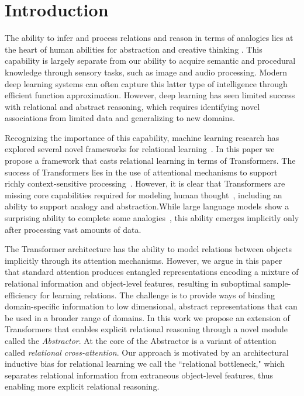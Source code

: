 \section{Introduction}

The ability to infer and process relations and reason in terms of analogies lies at the heart of human abilities for abstraction and creative thinking
\citep{snow,holyoak}. This capability is largely separate from our ability to acquire semantic and procedural knowledge through sensory tasks, such as image and audio processing. Modern deep learning systems can often capture this latter type of intelligence through efficient function approximation. However, deep learning has seen limited success with relational and abstract reasoning, which requires identifying novel associations from limited data and generalizing to new domains.

Recognizing the importance of this capability, machine learning research has explored several novel frameworks for relational learning~\citep{TEM, NTM,episodicControl,shanahanExplicitlyRelationalNeural,esbn,mondal23learned,battaglia,barrett:2018,santoro1}. In this paper we propose a framework that casts relational learning in terms of Transformers. The success of Transformers lies in the use of attentional mechanisms to support richly context-sensitive processing~\citep{transformers,vaswani2017attention,kerg2020untangling}. However, it is clear that Transformers are missing core capabilities required for modeling human thought~\citep{mahowald2023dissociating}, including an ability to support analogy and abstraction.While large language models show a surprising ability to complete some analogies~\citep{webb}, this ability emerges implicitly only after processing vast amounts of data.

The Transformer architecture has the ability to model relations between objects implicitly through its attention mechanisms. However, we argue in this paper that standard attention produces entangled representations encoding a mixture of relational information and object-level features, resulting in suboptimal sample-efficiency for learning relations. The challenge is to provide ways of binding domain-specific information to low dimensional, abstract representations that can be used in a broader range of domains. In this work we propose an extension of Transformers that enables explicit relational reasoning through a novel module called the \textit{Abstractor}. At the core of the Abstractor is a variant of attention called \textit{relational cross-attention}. Our approach is motivated by an architectural inductive bias for relational learning we call the ``relational bottleneck," which separates relational information from extraneous object-level features, thus enabling more explicit relational reasoning. %

